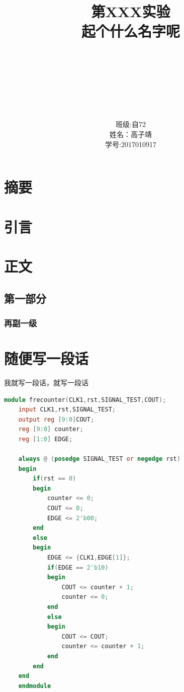 \documentclass[a4paper,11pt]{article}
\title{\huge{\textbf{第XXX实验} \\ \textbf{起个什么名字呢}}}
\author{
    \\
    \\
    \\
    \\
    \\
    \\
    \begin{tabular}{ll}
        班级: & 自72\\
        姓名：& 高子靖\\
        学号: &2017010917\\
    \end{tabular}
}
\date{}
\begin{document}
\maketitle
\thispagestyle{empty}
\setcounter{page}{0}
\newpage

\tableofcontents


\section{摘要}

\section{引言}

\section{正文}

\subsection{第一部分}

\subsubsection{再副一级}


\section{随便写一段话}
\par{} 我就写一段话，就写一段话




\begin{lstlisting}[language = Verilog]
    module frecounter(CLK1,rst,SIGNAL_TEST,COUT);
    input CLK1,rst,SIGNAL_TEST;
    output reg [9:0]COUT;
    reg [9:0] counter;
    reg [1:0] EDGE;
    
    always @ (posedge SIGNAL_TEST or negedge rst)
    begin
        if(rst == 0)
        begin
            counter <= 0;
            COUT <= 0;
            EDGE <= 2'b00;
        end
        else
        begin
            EDGE <= {CLK1,EDGE[1]};
            if(EDGE == 2'b10)
            begin
                COUT <= counter + 1;
                counter <= 0;
            end
            else
            begin
                COUT <= COUT;
                counter <= counter + 1;
            end
        end
    end
    endmodule
\end{lstlisting}
\end{document}
